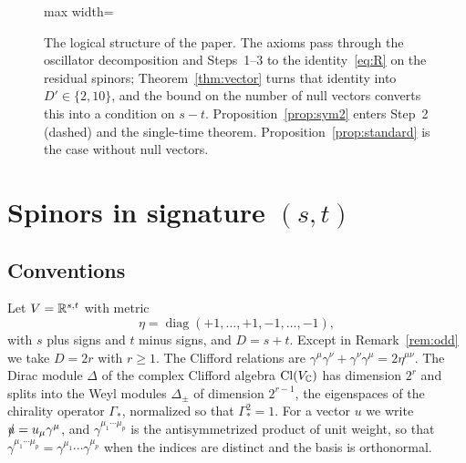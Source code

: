 \begin{figure}[t]
\begin{adjustbox}{max width=\linewidth}
\end{adjustbox}
\caption{The logical structure of the paper. The axioms pass through the oscillator decomposition and Steps~1--3 to the identity~\eqref{eq:R} on the residual spinors; Theorem~\ref{thm:vector} turns that identity into $D'\in\{2,10\}$, and the bound on the number of null vectors converts this into a condition on $s-t$. Proposition~\ref{prop:sym2} enters Step~2 (dashed) and the single-time theorem. Proposition~\ref{prop:standard} is the case without null vectors.}
\label{fig:proofmap}
\end{figure}

\section{Spinors in signature \texorpdfstring{$(s,t)$}{(s,t)}}
\label{sec:spinors}

\subsection{Conventions}

Let $V=\mathbb{R}^{s,t}$ with metric
\[
\eta=\operatorname{diag}(+1,\dots,+1,-1,\dots,-1),
\]
with $s$ plus signs and $t$ minus signs, and $D=s+t$. Except in Remark~\ref{rem:odd} we take $D=2r$ with $r\ge1$. The Clifford relations are $\gamma^\mu\gamma^\nu+\gamma^\nu\gamma^\mu=2\eta^{\mu\nu}$. The Dirac module $\Delta$ of the complex Clifford algebra $\operatorname{Cl}(V_{\mathbb{C}})$ has dimension $2^r$ and splits into the Weyl modules $\Delta_\pm$ of dimension $2^{r-1}$, the eigenspaces of the chirality operator $\Gamma_*$, normalized so that $\Gamma_*^2=1$. For a vector $u$ we write $\slashed{u}=u_\mu\gamma^\mu$, and $\gamma^{\mu_1\cdots\mu_p}$ is the antisymmetrized product of unit weight, so that $\gamma^{\mu_1\cdots\mu_p}=\allowbreak\gamma^{\mu_1}\cdots\gamma^{\mu_p}$ when the indices are distinct and the basis is orthonormal.

